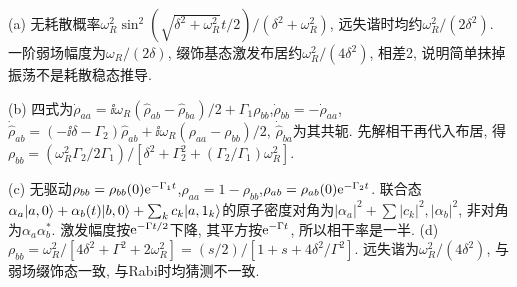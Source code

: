 \begin{solution}(a) 无耗散概率$\omega_R^2\sin^2(\sqrt{\delta^2+\omega_R^2}t/2)/(\delta^2+\omega_R^2)$, 远失谐时均约$\omega_R^2/(2\delta^2)$. 一阶弱场幅度为$\omega_R/(2\delta)$, 缀饰基态激发布居约$\omega_R^2/(4\delta^2)$, 相差2, 说明简单抹掉振荡不是耗散稳态推导.

(b) 四式为$\dot\rho_{aa}=\ii\omega_R(\widehat\rho_{ab}-\widehat\rho_{ba})/2+\Gamma_1\rho_{bb}$,$\dot\rho_{bb}=-\dot\rho_{aa}$, $\dot{\widehat\rho}_{ab}=(-\ii\delta-\Gamma_2)\widehat\rho_{ab}+\ii\omega_R(\rho_{aa}-\rho_{bb})/2$, $\dot{\widehat\rho}_{ba}$为其共轭. 先解相干再代入布居, 得$\rho_{bb}=(\omega_R^2\Gamma_2/2\Gamma_1)/[\delta^2+\Gamma_2^2+(\Gamma_2/\Gamma_1)\omega_R^2]$.

(c) 无驱动$\rho_{bb}=\rho_{bb}(0)\mathrm e^{-\Gamma_1t}$,$\rho_{aa}=1-\rho_{bb}$,$\rho_{ab}=\rho_{ab}(0)\mathrm e^{-\Gamma_2t}$. 联合态$\alpha_a\lvert a,0\rangle+\alpha_b(t)\lvert b,0\rangle+\sum_kc_k\lvert a,1_k\rangle$的原子密度对角为$|\alpha_a|^2+\sum|c_k|^2,|\alpha_b|^2$, 非对角为$\alpha_a\alpha_b^*$. 激发幅度按$\mathrm e^{-\Gamma t/2}$下降, 其平方按$\mathrm e^{-\Gamma t}$, 所以相干率是一半. (d) $\rho_{bb}=\omega_R^2/[4\delta^2+\Gamma^2+2\omega_R^2]=(s/2)/[1+s+4\delta^2/\Gamma^2]$. 远失谐为$\omega_R^2/(4\delta^2)$, 与弱场缀饰态一致, 与Rabi时均猜测不一致.
\end{solution}

